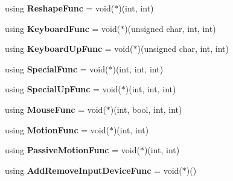 \begin{DoxyCompactItemize}
\item 
\mbox{\label{namespace_blade_a4cce5973db8590eaa00548d807c95bbf}} 
using {\bfseries Reshape\+Func} = void($\ast$)(int, int)
\item 
\mbox{\label{namespace_blade_a7bc11085b6350eb04d09a68996f6682d}} 
using {\bfseries Keyboard\+Func} = void($\ast$)(unsigned char, int, int)
\item 
\mbox{\label{namespace_blade_aec2dfb9c268bd61242997514fe1a1ce8}} 
using {\bfseries Keyboard\+Up\+Func} = void($\ast$)(unsigned char, int, int)
\item 
\mbox{\label{namespace_blade_aab8f36346f3465189818fbaf633173c5}} 
using {\bfseries Special\+Func} = void($\ast$)(int, int, int)
\item 
\mbox{\label{namespace_blade_a9225ec9ac84fdfcb7c241ca882c88c34}} 
using {\bfseries Special\+Up\+Func} = void($\ast$)(int, int, int)
\item 
\mbox{\label{namespace_blade_ae391e972c644a2cb743bd3bb84584391}} 
using {\bfseries Mouse\+Func} = void($\ast$)(int, bool, int, int)
\item 
\mbox{\label{namespace_blade_a577c549a0d44eb0aa83e1a8a009993df}} 
using {\bfseries Motion\+Func} = void($\ast$)(int, int)
\item 
\mbox{\label{namespace_blade_abc52b71ab154798c5aba3938f21e9f7b}} 
using {\bfseries Passive\+Motion\+Func} = void($\ast$)(int, int)
\item 
\mbox{\label{namespace_blade_aa1189a1a4a47a4447f12c5cbe6be678c}} 
using {\bfseries Add\+Remove\+Input\+Device\+Func} = void($\ast$)()
\end{DoxyCompactItemize}
